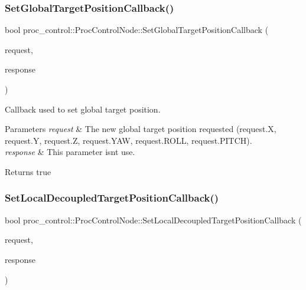 \subsubsection{\texorpdfstring{Set\+Global\+Target\+Position\+Callback()}{SetGlobalTargetPositionCallback()}}
{\footnotesize\ttfamily bool proc\+\_\+control\+::\+Proc\+Control\+Node\+::\+Set\+Global\+Target\+Position\+Callback (\begin{DoxyParamCaption}\item[{proc\+\_\+control\+::\+Set\+Position\+Target\+Request \&}]{request,  }\item[{proc\+\_\+control\+::\+Set\+Position\+Target\+Response \&}]{response }\end{DoxyParamCaption})}

Callback used to set global target position. 
\begin{DoxyParams}{Parameters}
{\em request} & The new global target position requested (request.\+X, request.\+Y, request.\+Z, request.\+Y\+AW, request.\+R\+O\+LL, request.\+P\+I\+T\+CH). \\
\hline
{\em response} & This parameter isn\textquotesingle{}t use. \\
\hline
\end{DoxyParams}
\begin{DoxyReturn}{Returns}
true 
\end{DoxyReturn}
\mbox{\label{classproc__control_1_1_proc_control_node_a01301ec4fcd9e4d149994cbe27ff8ca1}} 
\subsubsection{\texorpdfstring{Set\+Local\+Decoupled\+Target\+Position\+Callback()}{SetLocalDecoupledTargetPositionCallback()}}
{\footnotesize\ttfamily bool proc\+\_\+control\+::\+Proc\+Control\+Node\+::\+Set\+Local\+Decoupled\+Target\+Position\+Callback (\begin{DoxyParamCaption}\item[{proc\+\_\+control\+::\+Set\+Decoupled\+Target\+Request \&}]{request,  }\item[{proc\+\_\+control\+::\+Set\+Decoupled\+Target\+Response \&}]{response }\end{DoxyParamCaption})}

